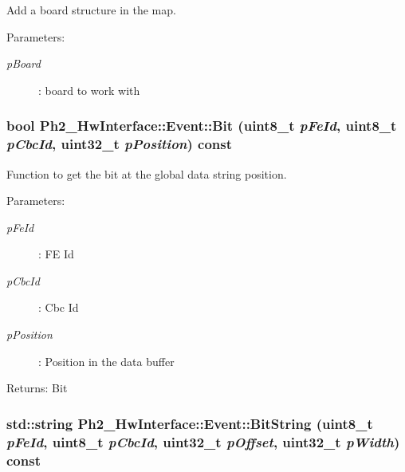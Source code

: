 Add a board structure in the map. 

\begin{Desc}
\item[Parameters:]
\begin{description}
\item[{\em p\-Board}]: board to work with \end{description}
\end{Desc}
\hypertarget{class_ph2___hw_interface_1_1_event_5b542b0d98a413feef14cc57cff250bf}{
\subsubsection[Bit]{\setlength{\rightskip}{0pt plus 5cm}bool Ph2\_\-Hw\-Interface::Event::Bit (uint8\_\-t {\em p\-Fe\-Id}, uint8\_\-t {\em p\-Cbc\-Id}, uint32\_\-t {\em p\-Position}) const}}
\label{class_ph2___hw_interface_1_1_event_5b542b0d98a413feef14cc57cff250bf}


Function to get the bit at the global data string position. 

\begin{Desc}
\item[Parameters:]
\begin{description}
\item[{\em p\-Fe\-Id}]: FE Id \item[{\em p\-Cbc\-Id}]: Cbc Id \item[{\em p\-Position}]: Position in the data buffer \end{description}
\end{Desc}
\begin{Desc}
\item[Returns:]Bit \end{Desc}
\hypertarget{class_ph2___hw_interface_1_1_event_67261ba2ea976e1c265c8aa7fe1a4b2d}{
\subsubsection[BitString]{\setlength{\rightskip}{0pt plus 5cm}std::string Ph2\_\-Hw\-Interface::Event::Bit\-String (uint8\_\-t {\em p\-Fe\-Id}, uint8\_\-t {\em p\-Cbc\-Id}, uint32\_\-t {\em p\-Offset}, uint32\_\-t {\em p\-Width}) const}}
\label{class_ph2___hw_interface_1_1_event_67261ba2ea976e1c265c8aa7fe1a4b2d}


